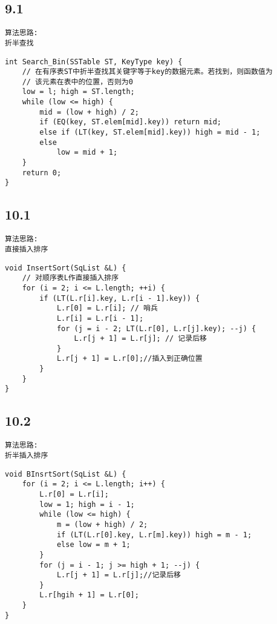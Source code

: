 \subsection{9.1}
\begin{lstlisting}[basicstyle=\small\ttfamily, caption={}, numbers=none]
算法思路:
折半查找
\end{lstlisting}
\begin{lstlisting}[basicstyle=\small\ttfamily, caption={}, numbers=none]
int Search_Bin(SSTable ST, KeyType key) {
	// 在有序表ST中折半查找其关键字等于key的数据元素。若找到，则函数值为
	// 该元素在表中的位置，否则为0
	low = l; high = ST.length;
	while (low <= high) {
		mid = (low + high) / 2;
		if (EQ(key, ST.elem[mid].key)) return mid;
		else if (LT(key, ST.elem[mid].key)) high = mid - 1;
		else
			low = mid + 1;
	}
	return 0;
}
\end{lstlisting}

\subsection{10.1}
\begin{lstlisting}[basicstyle=\small\ttfamily, caption={}, numbers=none]
算法思路:
直接插入排序
\end{lstlisting}
\begin{lstlisting}[basicstyle=\small\ttfamily, caption={}, numbers=none]
void InsertSort(SqList &L) {
	// 对顺序表L作直接插入排序
	for (i = 2; i <= L.length; ++i) {
		if (LT(L.r[i].key, L.r[i - 1].key)) {
			L.r[0] = L.r[i]; // 哨兵
			L.r[i] = L.r[i - 1];
			for (j = i - 2; LT(L.r[0], L.r[j].key); --j) {
				L.r[j + 1] = L.r[j]; // 记录后移
			}
			L.r[j + 1] = L.r[0];//插入到正确位置
		}
	}
}
\end{lstlisting}

\subsection{10.2}
\begin{lstlisting}[basicstyle=\small\ttfamily, caption={}, numbers=none]
算法思路:
折半插入排序
\end{lstlisting}
\begin{lstlisting}[basicstyle=\small\ttfamily, caption={}, numbers=none]
void BInsrtSort(SqList &L) {
	for (i = 2; i <= L.length; i++) {
		L.r[0] = L.r[i];
		low = 1; high = i - 1;
		while (low <= high) {
			m = (low + high) / 2;
			if (LT(L.r[0].key, L.r[m].key)) high = m - 1;
			else low = m + 1;
		}
		for (j = i - 1; j >= high + 1; --j) {
			L.r[j + 1] = L.r[j];//记录后移
		}
		L.r[hgih + 1] = L.r[0];
	}
}
\end{lstlisting}



